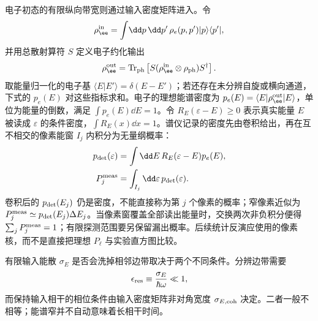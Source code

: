 电子初态的有限纵向带宽则通过输入密度矩阵进入。令
\begin{equation*}
 \rho_\ee^{\rm in}
 =\int\!\dd p\,\dd p'\,
 \rho_e(p,p')|p\rangle\langle p'|,
\end{equation*}
并用总散射算符 $S$ 定义电子约化输出
\begin{equation}
{
 \rho_\ee^{\rm out}
 =\operatorname{Tr}_{\rm ph}
 \left[S(\rho_\ee^{\rm in}\otimes\rho_{\rm ph})S^\dagger\right].}
\label{eq:finite_envelope_reduced_output_dp47}
\end{equation}
取能量归一化的电子基 $\langle E|E'\rangle=\delta(E-E')$；若还存在未分辨自旋或横向通道，下式的 $p_e(E)$ 对这些指标求和。电子的理想能谱密度为 $p_e(E)=\langle E|\rho_\ee^{\rm out}|E\rangle$，单位为能量的倒数，满足 $\int p_e(E)\dd E=1$。令 $R_E(\varepsilon-E)\ge0$ 表示真实能量 $E$ 被读成 $\varepsilon$ 的条件密度，$\int R_E(x)\dd x=1$。谱仪记录的密度先由卷积给出，再在互不相交的像素能窗 $I_j$ 内积分为无量纲概率：
\begin{equation}
{
 \begin{aligned}
 p_{\rm det}(\varepsilon)&=\int\dd E\,R_E(\varepsilon-E)p_e(E),\\
 P_j^{\rm meas}&=\int_{I_j}\dd\varepsilon\,p_{\rm det}(\varepsilon).
 \end{aligned}}
\label{eq:pinem_detector_convolution_dp47}
\end{equation}
卷积后的 $p_{\rm det}(E_j)$ 仍是密度，不能直接称为第 $j$ 个像素的概率；窄像素近似为 $P_j^{\rm meas}\simeq p_{\rm det}(E_j)\Delta E_j$。当像素窗覆盖全部读出能量时，交换两次非负积分便得 $\sum_jP_j^{\rm meas}=1$；有限探测范围要另保留漏出概率。后续统计反演应使用的像素核，而不是直接把理想 $P_\ell$ 与实验直方图比较。

有限输入能散 $\sigma_E$ 是否会洗掉相邻边带取决于两个不同条件。分辨边带需要
\begin{equation}
 \epsilon_{\rm res}\equiv\frac{\sigma_E}{\hbar\omega}\ll1,
\end{equation}
而保持输入相干的相位条件由输入密度矩阵非对角宽度 $\sigma_{E,{\rm coh}}$ 决定。二者一般不相等；能谱窄并不自动意味着长相干时间。
